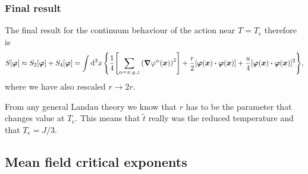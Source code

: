 \documentclass[11pt,letter, swedish, english
]{article}
\newcommand{\Tc}{\ensuremath{T_{\text{c}}}}
\begin{document}
\subsubsection{Final result}
The final result for the continuum behaviour of the action near
$T=\Tc$ therefore is
\begin{equation}
S[\vb*\varphi]\approx S_2[\vb*\varphi]+S_4[\vb*\varphi]=
\int\rd^3x\,\qty{
\frac{1}{4}\qty[\sum_{\alpha=x,y,z}\qty(\grad\varphi^\alpha(\vb*x))^2]
+\frac{r}{2}[\vb*\varphi(\vb*x)\vdot\vb*\varphi(\vb*x)]
+\frac{u}{4}[\vb*\varphi(\vb*x)\vdot\vb*\varphi(\vb*x)]^2},
\end{equation}
where we have also rescaled $r\to2r$.

From any general Landau theory we know that $r$ has to be the
parameter that changes value at $\Tc$. This means that $\tilde{t}$
really was the reduced temperature and that $\Tc=J/3$.





\subsection{Mean field critical exponents}
\end{document}
